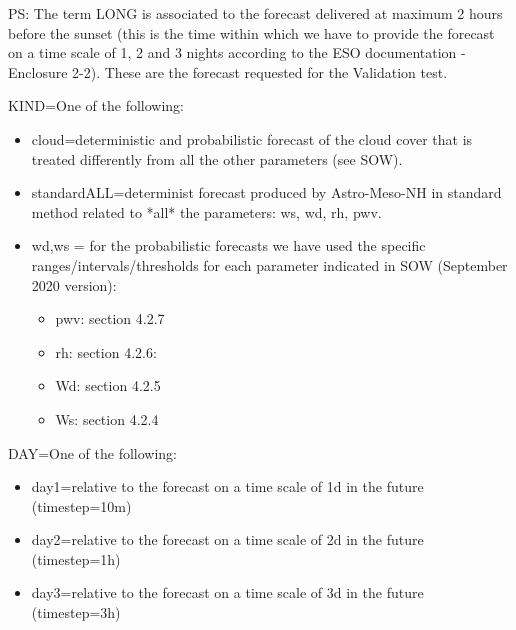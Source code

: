 PS: The term LONG is associated to the forecast delivered at maximum 2 hours before the sunset (this is the time within which we have to provide the forecast on a time scale of 1, 2 and 3 nights according to the ESO documentation - Enclosure 2-2). These are the forecast requested for the Validation test.


KIND=One of the following:
\begin{itemize}
\item cloud=deterministic and probabilistic forecast of the cloud cover that is treated differently from all the other parameters (see SOW).
\item standardALL=determinist forecast produced by Astro-Meso-NH in standard method related to *all* the parameters: ws, wd, rh, pwv.
\item wd,ws = for the probabilistic forecasts we have used the specific ranges/intervals/thresholds for each parameter indicated in SOW (September 2020 version):
\begin{itemize}
\item pwv: section 4.2.7
\item rh: section 4.2.6:
\item Wd: section 4.2.5
\item Ws: section 4.2.4
\end{itemize}
\end{itemize}


DAY=One of the following:
\begin{itemize}
\item day1=relative to the forecast on a time scale of 1d in the future (timestep=10m)
\item day2=relative to the forecast on a time scale of 2d in the future (timestep=1h)
\item day3=relative to the forecast on a time scale of 3d in the future (timestep=3h)
\end{itemize}


